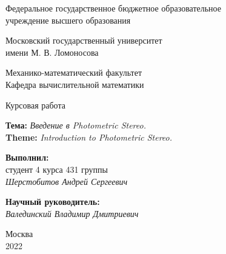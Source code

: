 \begin{titlepage}
  \begin{center}
    \large{Федеральное государственное бюджетное образовательное\\
      учреждение высшего образования\\}

    Московский государственный университет\\
    имени М. В. Ломоносова\\

    \vspace{0.25 cm}

    \normalsize{Механико-математический факультет\\}
    \vspace{0.5 cm}
    Кафедра вычислительной математики\\
  \end{center}

  \vspace{3cm}

  \begin{center}
    \LARGE{Курсовая работа}\\

    \vspace{0.5 cm}

    \normalsize{}
    \textbf{Тема:} \textit{Введение в Photometric Stereo.} \\
    \textbf{Theme:} \textit{Introduction to Photometric Stereo.}
  \end{center}

  \vspace{3 cm}

  \begin{flushright}
    \textbf{Выполнил:}\\
    студент 4 курса
    431 группы\\

    \textit{Шерстобитов Андрей Сергеевич}\\

    \vspace{1 cm}

    \textbf{Научный руководитель:}\\

    \textit{Валединский Владимир Дмитриевич}
  \end{flushright}

  \vspace{\fill}
  \normalsize{}
  \begin{center}
    Москва\\2022
  \end{center}

  \thispagestyle{empty}
\end{titlepage}
